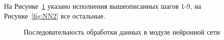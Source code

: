На Рисунке~\cref{fig:NN1} указано исполнения вышеописанных шагов 1-9, на Рисунке~\cref{fig:NN2} все остальные.
\begin{figure}[ht]
    \caption{Последовательность обработки данных в модуле нейронной сети}\label{fig:NN1}
\end{figure}
